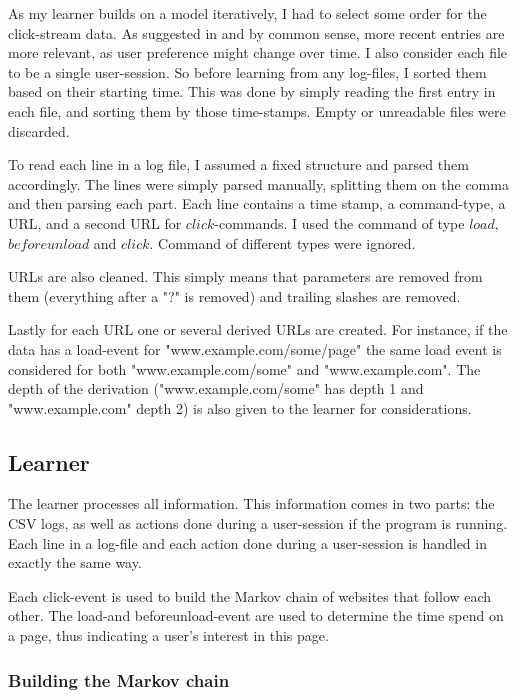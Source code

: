 \documentclass{article}
\begin{document}
As my learner builds on a model iteratively, I had to select some order for the click-stream data.
As suggested in \cite{davison1998predicting} and by common sense, more recent entries are more relevant, as user preference might change over time.
I also consider each file to be a single user-session.
So before learning from any log-files, I sorted them based on their starting time.
This was done by simply reading the first entry in each file, and sorting them by those time-stamps.
Empty or unreadable files were discarded.

To read each line in a log file, I assumed a fixed structure and parsed them accordingly.
The lines were simply parsed manually, splitting them on the comma and then parsing each part.
Each line contains a time stamp, a command-type, a URL, and a second URL for $click$-commands.
I used the command of type $load$, $beforeunload$ and $click$.
Command of different types were ignored.

URLs are also cleaned.
This simply means that parameters are removed from them (everything after a "?" is removed) and trailing slashes are removed.

Lastly for each URL one or several derived URLs are created.
For instance, if the data has a load-event for "www.example.com/some/page" the same load event is considered for both "www.example.com/some" and "www.example.com".
The depth of the derivation ("www.example.com/some" has depth 1 and "www.example.com" depth 2) is also given to the learner for considerations.

\subsection{Learner}

The learner processes all information.
This information comes in two parts: the CSV logs, as well as actions done during a user-session if the program is running.
Each line in a log-file and each action done during a user-session is handled in exactly the same way.

Each click-event is used to build the Markov chain of websites that follow each other. The load-and beforeunload-event are used to determine the time spend on a page, thus indicating a user's interest in this page.

\subsubsection{Building the Markov chain}
\end{document}
